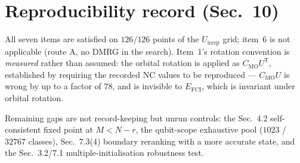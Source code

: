 \section{Reproducibility record (Sec.~10)}
\label{sec:repro}
All seven items are satisfied on $126/126$ points of the $U_{\mathrm{irrep}}$
grid; item~6 is not applicable (route A, no DMRG in the search).
Item~1's rotation convention is \emph{measured} rather than assumed: the
orbital rotation is applied as $C_{\mathrm{MO}} U^{\mathsf T}$, established by
requiring the recorded NC values to be reproduced --- $C_{\mathrm{MO}} U$ is
wrong by up to a factor of $78$, and is invisible to $E_{\mathrm{FCI}}$, which
is invariant under orbital rotation.

Remaining gaps are not record-keeping but unrun controls: the Sec.~4.2
self-consistent fixed point at $M < N-r$, the qubit-scope exhaustive pool
($1023$ / $32767$ classes), Sec.~7.3(4) boundary reranking with a more accurate
state, and the Sec.~3.2/7.1 multiple-initialisation robustness test.

